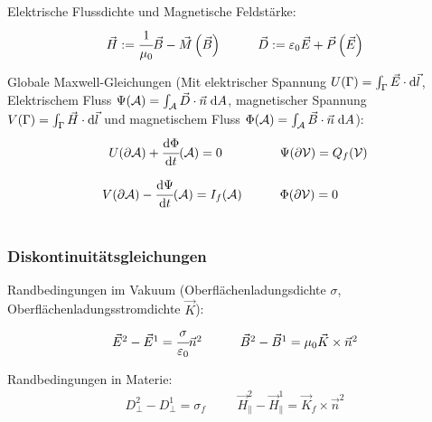 \documentclass[11pt]{article}
\numberwithin{equation}{section}
\begin{document}
			\noindent
			Elektrische Flussdichte und Magnetische Feldstärke:
			\begin{equation} \label{eq:flussdichte-feldstärke}
			\begin{array}{cc}
				\vec{H} := \cfrac{1}{\mu_0}\Vec{B} - \vec{M}\left(\vec{B}\right)
				&\hspace{20pt} \vec{D} := \varepsilon_0\vec{E} + \vec{P}\left(\vec{E}\right)
			\end{array}
			\end{equation}


			\noindent
			Globale Maxwell-Gleichungen (Mit elektrischer Spannung $U(\Gamma)=\int_\Gamma \vec{E}\cdot\mathrm{d}\vec{l}$, Elektrischem Fluss $\Psi(\mathcal{A})=\int_\mathcal{A}\vec{D}\cdot\vec{n}\;\mathrm{d} A$, magnetischer Spannung $V(\Gamma)=\int_\Gamma \vec{H}\cdot\mathrm{d}\vec{l}$ und magnetischem Fluss $\Phi(\mathcal{A})=\int_\mathcal{A}\vec{B}\cdot\vec{n}\;\mathrm{d} A$):
			\begin{equation}
			\begin{array}{rl}
				U(\partial \mathcal{A}) + \cfrac{\diff\Phi}{\diff t}(\mathcal{A}) = 0\phantom{(\mathcal{A})}
				&\hspace{20pt} \Psi(\partial\mathcal{V}) = Q_f(\mathcal{V}) \\ \xrowht{40pt}
				V(\partial \mathcal{A}) - \cfrac{\diff \Psi}{\diff t}(\mathcal{A}) = I_f(\mathcal{A})
				&\hspace{20pt} \Phi(\partial\mathcal{V}) = 0 \\
			\end{array}
			\end{equation}

			\subsubsection{Diskontinuitätsgleichungen}
				\noindent
				Randbedingungen im Vakuum (Oberflächenladungsdichte $\sigma$, Oberflächenladungsstromdichte $\vec{K}$):
			\begin{equation}
			\begin{array}{cc}
				\vec{E}^2 - \vec{E}^1 = \cfrac{\sigma}{\varepsilon_0}\Vec{n}^2
				&\hspace{20pt} \vec{B}^2 - \vec{B}^1 = \mu_0\vec{K}\times\Vec{n}^2
			\end{array}
			\end{equation}

				\noindent
				Randbedingungen in Materie:
			\begin{equation}
			\begin{array}{cc}
				D_\perp^2 - D_\perp^1 = \sigma_f
				&\hspace{20pt} \vec{H}_\parallel^2 - \vec{H}_\parallel^1 = \vec{K}_f\times\Vec{n}^2
			\end{array}
			\end{equation}
\end{document}
